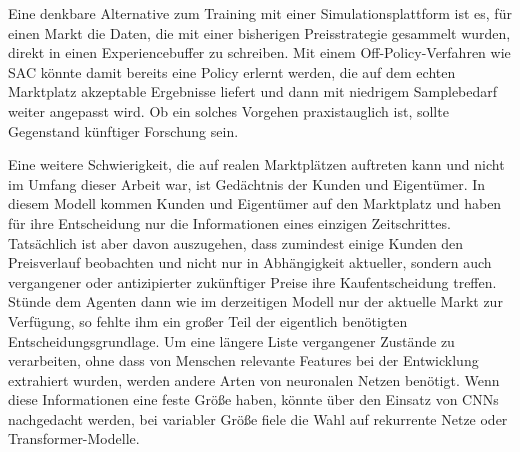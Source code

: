 Eine denkbare Alternative zum Training mit einer Simulationsplattform ist es, für einen Markt die Daten, die mit einer bisherigen Preisstrategie gesammelt wurden, direkt in einen Experiencebuffer zu schreiben.
Mit einem Off-Policy-Verfahren wie SAC könnte damit bereits eine Policy erlernt werden, die auf dem echten Marktplatz akzeptable Ergebnisse liefert und dann mit niedrigem Samplebedarf weiter angepasst wird.
Ob ein solches Vorgehen praxistauglich ist, sollte Gegenstand künftiger Forschung sein.

Eine weitere Schwierigkeit, die auf realen Marktplätzen auftreten kann und nicht im Umfang dieser Arbeit war, ist Gedächtnis der Kunden und Eigentümer.
In diesem Modell kommen Kunden und Eigentümer auf den Marktplatz und haben für ihre Entscheidung nur die Informationen eines einzigen Zeitschrittes.
Tatsächlich ist aber davon auszugehen, dass zumindest einige Kunden den Preisverlauf beobachten und nicht nur in Abhängigkeit aktueller, sondern auch vergangener oder antizipierter zukünftiger Preise ihre Kaufentscheidung treffen.
Stünde dem Agenten dann wie im derzeitigen Modell nur der aktuelle Markt zur Verfügung, so fehlte ihm ein großer Teil der eigentlich benötigten Entscheidungsgrundlage.
Um eine längere Liste vergangener Zustände zu verarbeiten, ohne dass von Menschen relevante Features bei der Entwicklung extrahiert wurden, werden andere Arten von neuronalen Netzen benötigt.
Wenn diese Informationen eine feste Größe haben, könnte über den Einsatz von CNNs nachgedacht werden, bei variabler Größe fiele die Wahl auf rekurrente Netze oder Transformer-Modelle.